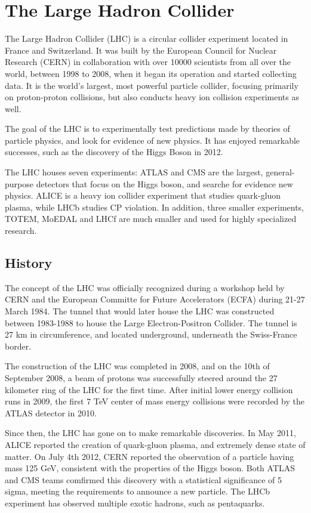 \documentclass[11pt,a4paper,openright,twoside]{report}
\begin{document}
\chapter{The Large Hadron Collider}\label{ch:LHC}
The Large Hadron Collider (LHC) is a circular collider experiment located in France and Switzerland. It was built by the European Council for Nuclear Research (CERN) in collaboration with over 10000 scientists from all over the world, between 1998 to 2008, when it began its operation and started collecting data. It is the world's largest, most powerful particle collider, focusing primarily on proton-proton collisions, but also conducts heavy ion collision experiments as well.

The goal of the LHC is to experimentally test predictions made by theories of particle physics, and look for evidence of new physics. It has enjoyed remarkable successes, such as the discovery of the Higgs Boson in 2012.

The LHC houses seven experiments: ATLAS and CMS are the largest, general-purpose detectors that focus on the Higgs boson, and searche for evidence new physics. ALICE is a heavy ion collider experiment that studies quark-gluon plasma, while LHCb studies CP violation. In addition, three smaller experiments, TOTEM, MoEDAL and LHCf are much smaller and used for highly specialized research.

\section{History}
The concept of the LHC was officially recognized during a workshop held by CERN and the European Committe for Future Accelerators (ECFA) during 21-27 March 1984. The tunnel that would later house the LHC was constructed between 1983-1988 to house the Large Electron-Positron Collider. The tunnel is 27 km in circumference, and located underground, underneath the Swiss-France border.

The construction of the LHC was completed in 2008, and on the 10th of September 2008, a beam of protons was successfully steered around the 27 kilometer ring of the LHC for the first time. After initial lower energy collision runs in 2009, the first 7 TeV center of mass energy collisions were recorded by the ATLAS detector in 2010.

Since then, the LHC has gone on to make remarkable discoveries. In May 2011, ALICE reported the creation of quark-gluon plasma, and extremely dense state of matter. On July 4th 2012, CERN reported the observation of a particle having mass 125 GeV, consistent with the properties of the Higgs boson. Both ATLAS and CMS teams comfirmed this discovery with a statistical significance of 5 sigma, meeting the requirements to announce a new particle. The LHCb experiment has observed multiple exotic hadrons, such as pentaquarks.
\vfill
\end{document}
